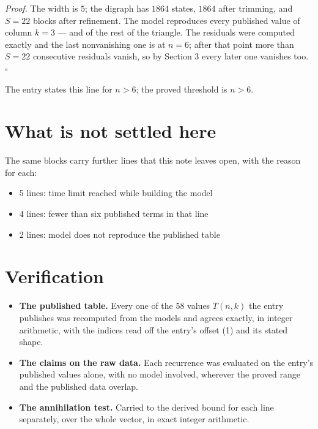 \documentclass[11pt]{article}
\theoremstyle{definition}
\begin{document}
{\itshape Proof.} The width is $5$; the digraph has $1864$ states, $1864$ after trimming, and $S = 22$ blocks after refinement. The model reproduces every published value of column $k = 3$ --- and of the rest of the triangle. The residuals were computed exactly and the last nonvanishing one is at $n = 6$; after that point more than $S = 22$ consecutive residuals vanish, so by Section 3 every later one vanishes too. $\square$

The entry states this line for $n > 6$; the proved threshold is $n > 6$.

\section{What is not settled here}

The same blocks carry further lines that this note leaves open, with the reason for each:

\begin{itemize}

\item 5 lines: time limit reached while building the model

\item 4 lines: fewer than six published terms in that line

\item 2 lines: model does not reproduce the published table

\end{itemize}

\section{Verification}

\begin{itemize}

\item {\bfseries The published table.} Every one of the 58 values $T(n,k)$ the entry publishes was recomputed from the models and agrees exactly, in integer arithmetic, with the indices read off the entry's offset (1) and its stated shape.

\item {\bfseries The claims on the raw data.} Each recurrence was evaluated on the entry's published values alone, with no model involved, wherever the proved range and the published data overlap.

\item {\bfseries The annihilation test.} Carried to the derived bound for each line separately, over the whole vector, in exact integer arithmetic.

\end{itemize}
\end{document}
